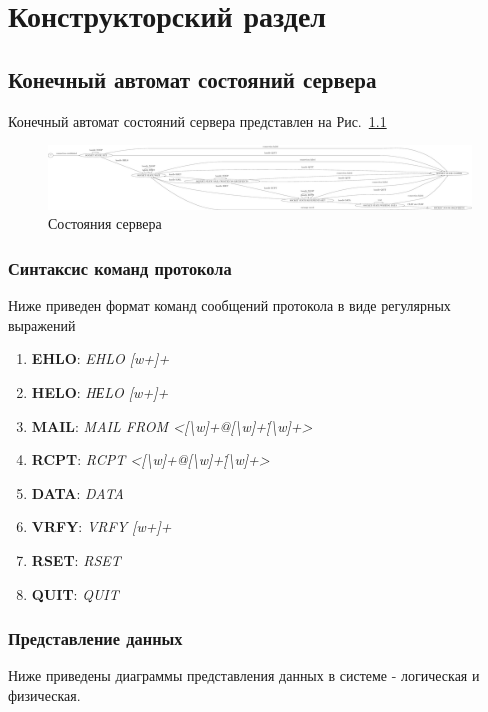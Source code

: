 \documentclass[a4paper,12pt]{report}
\begin{document}
\chapter{Конструкторский раздел}

\section{Конечный автомат состояний сервера}

Конечный автомат состояний сервера представлен на Рис.~\ref{fig:server_fsm} 

\begin{figure}
\centering
\includegraphics[width=\textwidth]{static/server_dot.pdf}
\caption{Состояния сервера}
\label{fig:server_fsm}
\end{figure}

\subsection{Синтаксис команд протокола}
Ниже приведен формат команд сообщений протокола в виде регулярных выражений
\begin{enumerate}
\item \textbf{EHLO}: {\it EHLO [w+]+\/}
\item \textbf{HELO}: {\it HЕLO [w+]+\/}
\item \textbf{MAIL}: {\it MAIL FROM <[\textbackslash w]+@[\textbackslash w]+\.[\textbackslash w]+>\/}
\item \textbf{RCPT}: {\it RCPT <[\textbackslash w]+@[\textbackslash w]+\.[\textbackslash w]+>\/}
\item \textbf{DATA}: {\it DATA\/}
\item \textbf{VRFY}: {\it VRFY [w+]+\/}
\item \textbf{RSET}: {\it RSET\/}
\item \textbf{QUIT}: {\it QUIT\/}
\end{enumerate}

\subsection*{Представление данных}
Ниже приведены диаграммы представления данных в системе - логическая и физическая.
\end{document}
